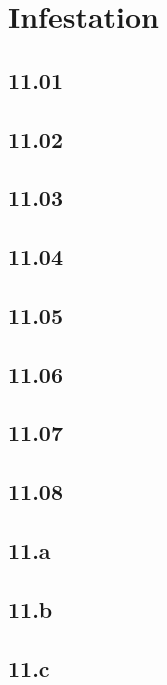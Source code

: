 \part{Infestation}

\chapter{11.01}


\chapter{11.02}


\chapter{11.03}


\chapter{11.04}


\chapter{11.05}


\chapter{11.06}


\chapter{11.07}


\chapter{11.08}


\chapter{11.a}


\chapter{11.b}


\chapter{11.c}


